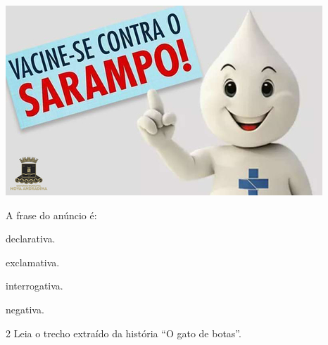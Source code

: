 \begin{center}
\includegraphics[width=\textwidth]{./media/image7.jpeg}
\end{center}

A frase do anúncio é:

\begin{escolha}[itemsep=-5pt]
\item
  declarativa.
\item
  exclamativa.
\item
  interrogativa.
\item
  negativa.
\end{escolha}

\num{2} Leia o trecho extraído da história ``O gato de botas''.

